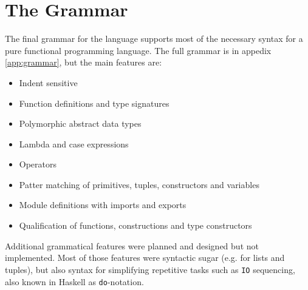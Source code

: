 \section{The Grammar}


The final grammar for the language supports most of the necessary syntax for a pure functional programming language.  The full grammar is in appedix \ref{app:grammar}, but the main features are:

\begin{itemize}
  \item Indent sensitive
  \item Function definitions and type signatures
  \item Polymorphic abstract data types
  \item Lambda and case expressions
  \item Operators
  \item Patter matching of primitives, tuples, constructors and variables
  \item Module definitions with imports and exports
  \item Qualification of functions, constructions and type constructors
\end{itemize}

Additional grammatical features %
were planned and designed but not implemented. Most of those features were syntactic sugar (e.g. for lists and tuples), but also syntax for simplifying repetitive tasks such as \texttt{IO} sequencing, also known in Haskell as \texttt{do}-notation. 
